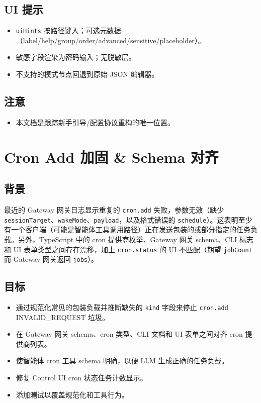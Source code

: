 \subsection{UI 提示}


\begin{itemize}
  \item \texttt{uiHints} 按路径键入；可选元数据（label/help/group/order/advanced/sensitive/placeholder）。
  \item 敏感字段渲染为密码输入；无脱敏层。
  \item 不支持的模式节点回退到原始 JSON 编辑器。
\end{itemize}


\subsection{注意}


\begin{itemize}
  \item 本文档是跟踪新手引导/配置协议重构的唯一位置。
\end{itemize}



\clearpage

\section{Cron Add 加固 \& Schema 对齐}


\subsection{背景}


最近的 Gateway 网关日志显示重复的 \texttt{cron.add} 失败，参数无效（缺少 \texttt{sessionTarget}、\texttt{wakeMode}、\texttt{payload}，以及格式错误的 \texttt{schedule}）。这表明至少有一个客户端（可能是智能体工具调用路径）正在发送包装的或部分指定的任务负载。另外，TypeScript 中的 cron 提供商枚举、Gateway 网关 schema、CLI 标志和 UI 表单类型之间存在漂移，加上 \texttt{cron.status} 的 UI 不匹配（期望 \texttt{jobCount} 而 Gateway 网关返回 \texttt{jobs}）。

\subsection{目标}


\begin{itemize}
  \item 通过规范化常见的包装负载并推断缺失的 \texttt{kind} 字段来停止 \texttt{cron.add} INVALID\_REQUEST 垃圾。
  \item 在 Gateway 网关 schema、cron 类型、CLI 文档和 UI 表单之间对齐 cron 提供商列表。
  \item 使智能体 cron 工具 schema 明确，以便 LLM 生成正确的任务负载。
  \item 修复 Control UI cron 状态任务计数显示。
  \item 添加测试以覆盖规范化和工具行为。
\end{itemize}


